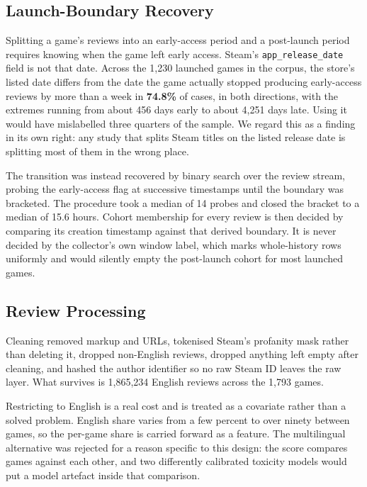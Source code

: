 \documentclass[sigconf]{acmart}
\begin{document}
\subsection{Launch-Boundary Recovery}
\label{sec:dataBoundary}

Splitting a game's reviews into an early-access period and a post-launch period requires knowing
when the game left early access. Steam's \texttt{app\_release\_date} field is not that date. Across
the 1,230 launched games in the corpus, the store's listed date differs from the date the game
actually stopped producing early-access reviews by more than a week in \textbf{74.8\%} of cases, in
both directions, with the extremes running from about 456 days early to about 4,251 days late.
Using it would have mislabelled three quarters of the sample. We regard this as a finding in its
own right: any study that splits Steam titles on the listed release date is splitting most of them
in the wrong place.

The transition was instead recovered by binary search over the review stream, probing the
early-access flag at successive timestamps until the boundary was bracketed. The procedure took a
median of 14 probes and closed the bracket to a median of 15.6 hours. Cohort membership for every
review is then decided by comparing its creation timestamp against that derived boundary. It is
never decided by the collector's own window label, which marks whole-history rows uniformly and
would silently empty the post-launch cohort for most launched games.

\subsection{Review Processing}
\label{sec:dataProcessing}

Cleaning removed markup and URLs, tokenised Steam's profanity mask rather than deleting it, dropped
non-English reviews, dropped anything left empty after cleaning, and hashed the author identifier
so no raw Steam ID leaves the raw layer. What survives is 1,865,234 English reviews across the
1,793 games.

Restricting to English is a real cost and is treated as a covariate rather than a solved problem.
English share varies from a few percent to over ninety between games, so the per-game share is
carried forward as a feature. The multilingual alternative was rejected for a reason specific to
this design: the score compares games against each other, and two differently calibrated toxicity
models would put a model artefact inside that comparison.
\end{document}
